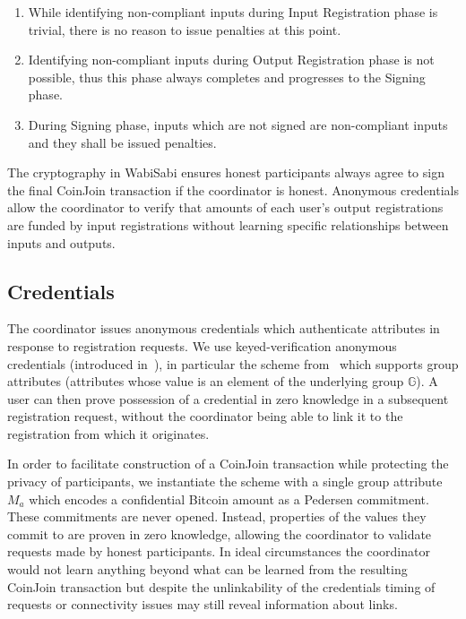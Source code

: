 \documentclass[a4paper]{article}
\begin{document}
\begin{enumerate}
    \item While identifying non-compliant inputs during Input Registration phase is trivial, there is no reason to issue penalties at this point.
    \item Identifying non-compliant inputs during Output Registration phase is not possible, thus this phase always completes and progresses to the Signing phase.
    \item During Signing phase, inputs which are not signed are non-compliant inputs and they shall be issued penalties.
\end{enumerate}

The cryptography in WabiSabi ensures honest participants always agree to sign the final CoinJoin transaction if the coordinator is honest. Anonymous credentials allow the coordinator to verify that amounts of each user's output registrations are funded by input registrations without learning specific relationships between inputs and outputs.

\subsection{Credentials}

The coordinator issues anonymous credentials which authenticate attributes in response to registration requests. We use keyed-verification anonymous credentials (introduced in~\cite{chase2014algebraic}), in particular the scheme from~\cite{chase2019signal} which supports group attributes (attributes whose value is an element of the underlying group $\mathbb{G}$). A user can then prove possession of a credential in zero knowledge in a subsequent registration request, without the coordinator being able to link it to the registration from which it originates.

In order to facilitate construction of a CoinJoin transaction while protecting the privacy of participants, we instantiate the scheme with a single group attribute $M_a$ which encodes a confidential Bitcoin amount as a Pedersen commitment. These commitments are never opened. Instead, properties of the values they commit to are proven in zero knowledge, allowing the coordinator to validate requests made by honest participants. In ideal circumstances the coordinator would not learn anything beyond what can be learned from the resulting CoinJoin transaction but despite the unlinkability of the credentials timing of requests or connectivity issues may still reveal information about links.
\end{document}
